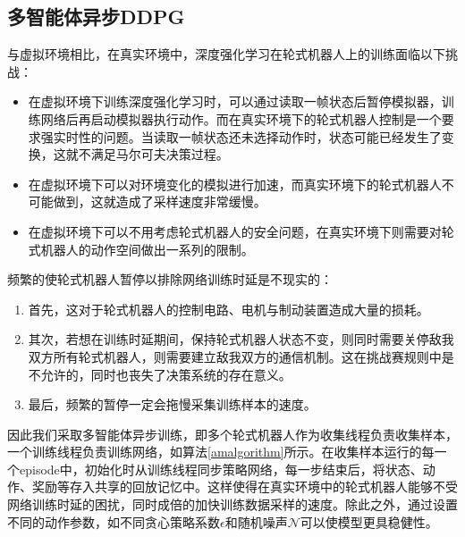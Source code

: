 \subsection{多智能体异步DDPG}
与虚拟环境相比，在真实环境中，深度强化学习在轮式机器人上的训练面临以下挑战：
\begin{itemize}
  \item 在虚拟环境下训练深度强化学习时，可以通过读取一帧状态后暂停模拟器，训练网络后再启动模拟器执行动作。而在真实环境下的轮式机器人控制是一个要求强实时性的问题。当读取一帧状态还未选择动作时，状态可能已经发生了变换，这就不满足马尔可夫决策过程。
  \item 在虚拟环境下可以对环境变化的模拟进行加速，而真实环境下的轮式机器人不可能做到，这就造成了采样速度非常缓慢。
  \item 在虚拟环境下可以不用考虑轮式机器人的安全问题，在真实环境下则需要对轮式机器人的动作空间做出一系列的限制。
\end{itemize}

频繁的使轮式机器人暂停以排除网络训练时延是不现实的：
\begin{enumerate}
  \item 首先，这对于轮式机器人的控制电路、电机与制动装置造成大量的损耗。
  \item 其次，若想在训练时延期间，保持轮式机器人状态不变，则同时需要关停敌我双方所有轮式机器人，则需要建立敌我双方的通信机制。这在挑战赛规则中是不允许的，同时也丧失了决策系统的存在意义。
  \item 最后，频繁的暂停一定会拖慢采集训练样本的速度。
\end{enumerate}

因此我们采取多智能体异步训练，即多个轮式机器人作为收集线程负责收集样本，一个训练线程负责训练网络，如算法\ref{amalgorithm}所示。在收集样本运行的每一个episode中，初始化时从训练线程同步策略网络，每一步结束后，将状态、动作、奖励等存入共享的回放记忆中。这样使得在真实环境中的轮式机器人能够不受网络训练时延的困扰，同时成倍的加快训练数据采样的速度。除此之外，通过设置不同的动作参数，如不同贪心策略系数$\epsilon$和随机噪声$\mathcal{N}$可以使模型更具稳健性。


